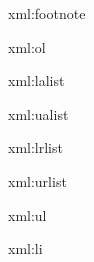 \startxmlsetups xml:footnote
    \startfootnote
    \stopfootnote
\stopxmlsetups

\startxmlsetups xml:ol
    \startitemize[n]
    \stopitemize
\stopxmlsetups

\startxmlsetups xml:lalist
    \startitemize[a]
    \stopitemize
\stopxmlsetups

\startxmlsetups xml:ualist
    \startitemize[A]
    \stopitemize
\stopxmlsetups

\startxmlsetups xml:lrlist
    \startitemize[r]
    \stopitemize
\stopxmlsetups

\startxmlsetups xml:urlist
    \startitemize[R]
    \stopitemize
\stopxmlsetups

\startxmlsetups xml:ul
    \startitemize
    \stopitemize
\stopxmlsetups

\startxmlsetups xml:li
    \startitem
    \stopitem
\stopxmlsetups
